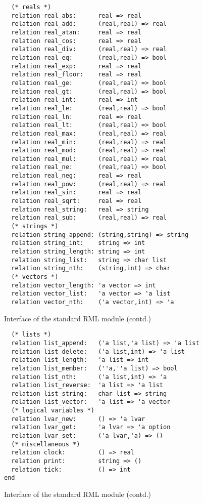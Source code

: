 \begin{figure}[htpb]
\begin{verbatim}
  (* reals *)
  relation real_abs:      real => real
  relation real_add:      (real,real) => real
  relation real_atan:     real => real
  relation real_cos:      real => real
  relation real_div:      (real,real) => real
  relation real_eq:       (real,real) => bool
  relation real_exp:      real => real
  relation real_floor:    real => real
  relation real_ge:       (real,real) => bool
  relation real_gt:       (real,real) => bool
  relation real_int:      real => int
  relation real_le:       (real,real) => bool
  relation real_ln:       real => real
  relation real_lt:       (real,real) => bool
  relation real_max:      (real,real) => real
  relation real_min:      (real,real) => real
  relation real_mod:      (real,real) => real
  relation real_mul:      (real,real) => real
  relation real_ne:       (real,real) => bool
  relation real_neg:      real => real
  relation real_pow:      (real,real) => real
  relation real_sin:      real => real
  relation real_sqrt:     real => real
  relation real_string:   real => string
  relation real_sub:      (real,real) => real
  (* strings *)  
  relation string_append: (string,string) => string
  relation string_int:    string => int
  relation string_length: string => int
  relation string_list:   string => char list
  relation string_nth:    (string,int) => char
  (* vectors *)
  relation vector_length: 'a vector => int
  relation vector_list:   'a vector => 'a list
  relation vector_nth:    ('a vector,int) => 'a
\end{verbatim}
\caption{Interface of the standard RML module (contd.)}
\end{figure}

\begin{figure}[htpb]
\begin{verbatim}
  (* lists *)
  relation list_append:   ('a list,'a list) => 'a list
  relation list_delete:   ('a list,int) => 'a list
  relation list_length:   'a list => int
  relation list_member:   (''a,''a list) => bool
  relation list_nth:      ('a list,int) => 'a
  relation list_reverse:  'a list => 'a list
  relation list_string:   char list => string
  relation list_vector:   'a list => 'a vector
  (* logical variables *)
  relation lvar_new:      () => 'a lvar
  relation lvar_get:      'a lvar => 'a option
  relation lvar_set:      ('a lvar,'a) => ()
  (* miscellaneous *)
  relation clock:         () => real
  relation print:         string => ()
  relation tick:          () => int
end
\end{verbatim}
\caption{Interface of the standard RML module (contd.)}
\end{figure}
%
